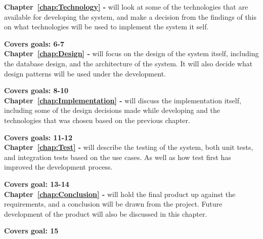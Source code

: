 \textbf{Chapter~\ref{chap:Technology} - } will look at some of the technologies that are available for developing the system, and make a decision from the findings of this on what technologies will be used to implement the system it self.

\textbf{Covers goals: 6-7}\\

\textbf{Chapter~\ref{chap:Design} - } will focus on the design of the system itself, including the database design, and the architecture of the system. It will also decide what design patterns will be used under the development.

\textbf{Covers goals: 8-10}\\

\textbf{Chapter~\ref{chap:Implementation} - } will discuss the implementation itself, including some of the design decisions made while developing and the technologies that was chosen based on the previous chapter.

\textbf{Covers goals: 11-12}\\

\textbf{Chapter~\ref{chap:Test} - } will describe the testing of the system, both unit tests, and integration tests based on the use cases. As well as how test first has improved the development process.

\textbf{Covers goal: 13-14}\\

\textbf{Chapter~\ref{chap:Conclusion} - } will hold the final product up against the requirements, and a conclusion will be drawn from the project. Future development of the product will also be discussed in this chapter.

\textbf{Covers goal: 15}
